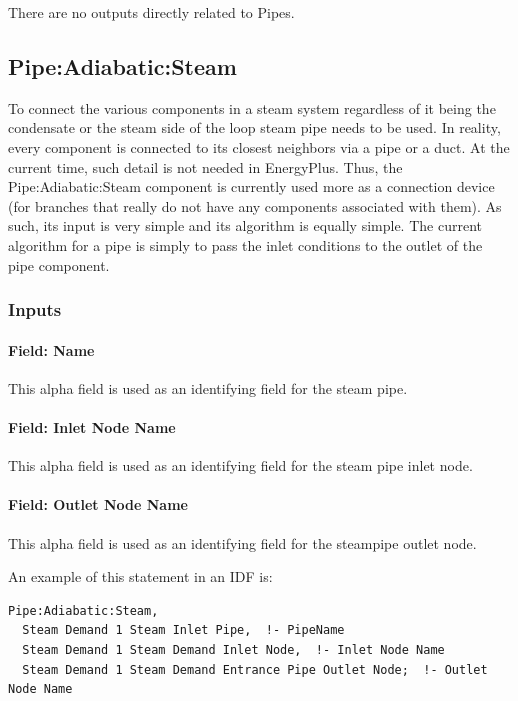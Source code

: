 There are no outputs directly related to Pipes.

\subsection{Pipe:Adiabatic:Steam}\label{pipeadiabaticsteam}

To connect the various components in a steam system regardless of it being the condensate or the steam side of the loop steam pipe needs to be used. In reality, every component is connected to its closest neighbors via a pipe or a duct. At the current time, such detail is not needed in EnergyPlus. Thus, the Pipe:Adiabatic:Steam component is currently used more as a connection device (for branches that really do not have any components associated with them). As such, its input is very simple and its algorithm is equally simple. The current algorithm for a pipe is simply to pass the inlet conditions to the outlet of the pipe component.

\subsubsection{Inputs}\label{inputs-5-017}

\paragraph{Field: Name}\label{field-name-5-013}

This alpha field is used as an identifying field for the steam pipe.

\paragraph{Field: Inlet Node Name}\label{field-inlet-node-name-1-000}

This alpha field is used as an identifying field for the steam pipe inlet node.

\paragraph{Field: Outlet Node Name}\label{field-outlet-node-name-1-001}

This alpha field is used as an identifying field for the steampipe outlet node.

An example of this statement in an IDF is:

\begin{lstlisting}
Pipe:Adiabatic:Steam,
  Steam Demand 1 Steam Inlet Pipe,  !- PipeName
  Steam Demand 1 Steam Demand Inlet Node,  !- Inlet Node Name
  Steam Demand 1 Steam Demand Entrance Pipe Outlet Node;  !- Outlet Node Name
\end{lstlisting}

